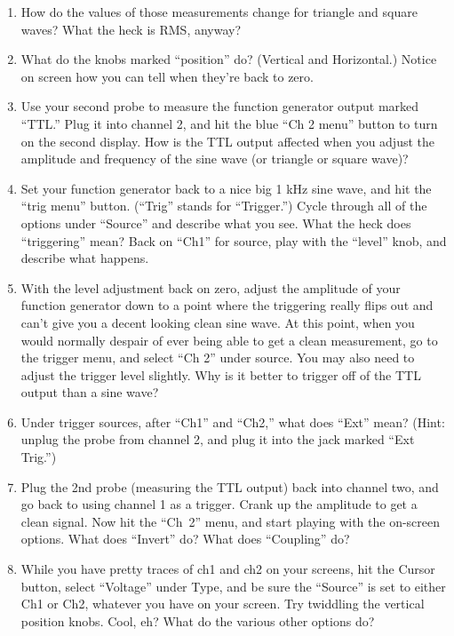 \begin{enumerate}[wide]
\item How do the values of those measurements change for triangle and square waves?  What the heck is RMS, anyway?

\item What do the knobs marked ``position'' do?  (Vertical and Horizontal.)  Notice on screen how you can tell when they're back to zero. 

\item Use your second probe to measure the function generator output marked ``TTL.'' Plug it into channel 2, and hit the blue ``Ch 2 menu'' button to turn on the second display.  How is the TTL output affected when you adjust the amplitude and frequency of the sine wave (or triangle or square wave)?

\item Set your function generator back to a nice big 1 kHz sine wave, and hit the ``trig menu'' button.  (``Trig'' stands for ``Trigger.'')  Cycle through all of the options under ``Source'' and describe what you see.  What the heck does ``triggering'' mean?  Back on ``Ch1'' for source, play with the ``level'' knob, and describe what happens.

\item With the level adjustment back on zero, adjust the amplitude of your function generator down to a point where the triggering really flips out and can't give you a decent looking clean sine wave.   At this point, when you would normally despair of ever being able to get a clean measurement, go to the trigger menu, and select ``Ch 2'' under source.  You may also need to adjust the trigger level slightly.  Why is it better to trigger off of the TTL output than a sine wave?

\item Under trigger sources, after ``Ch1'' and ``Ch2,'' what does ``Ext'' mean?  (Hint: unplug the probe from channel 2, and plug it into the jack marked ``Ext Trig.'')  

\item Plug the 2nd probe (measuring the TTL output) back into channel two, and go back to using channel 1 as a trigger.  Crank up the amplitude to get a clean signal.  Now hit the ``Ch~2'' menu, and start playing with the on-screen options.   What does ``Invert'' do?  What does ``Coupling'' do? 

\item While you have pretty traces of ch1 and ch2 on your screens, hit the Cursor button, select ``Voltage'' under Type, and be sure the ``Source'' is set to either Ch1 or Ch2, whatever you have on your screen.  Try twiddling the vertical position knobs.  Cool, eh?  What do the various other options do?


\end{enumerate}
